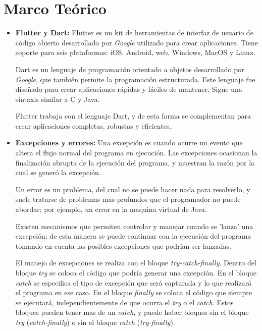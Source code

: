 \documentclass[letterpaper,12pt]{article}
\begin{document}
\section{Marco Teórico}
\begin{itemize}

    \item \textbf{Flutter y Dart:} Flutter es un kit de herramientas de interfaz de usuario de código abierto desarrollado por \textit{Google} utilizado para crear aplicaciones. Tiene soporte para seis plataformas: iOS, Android, web, Windows, MacOS y Linux.

    Dart es un lenguaje de programación orientado a objetos desarrollado por \textit{Google}, que también permite la programación estructurada. Este lenguaje fue diseñado para crear aplicaciones rápidas y fáciles de mantener. Sigue una sintaxis similar a C y Java.

    Flutter trabaja con el lenguaje Dart, y de esta forma se complementan para crear aplicaciones completas, robustas y eficientes. ~\cite{FlutterDart1} ~\cite{FlutterDart2}
    
    \item \textbf{Excepciones y errores:} Una excepción es cuando ocurre un evento que altera el flujo normal del programa en ejecución. Las excepciones ocasionan la finalización abrupta de la ejecución del programa, y muestran la razón por la cual se generó la excepción.

    Un error es un problema, del cual no se puede hacer nada para resolverlo, y suele tratarse de problemas mas profundos que el programador no puede abordar; por ejemplo, un error en la maquina virtual de Java.
    
    Existen mecanismos que permiten controlar y manejar cuando se 'lanza' una excepción; de esta manera se puede continuar con la ejecución del programa tomando en cuenta las posibles excepciones que podrían ser lanzadas.

    El manejo de excepciones se realiza con el bloque \textit{try-catch-finally}. Dentro del bloque \textit{try} se coloca el código que podría generar una excepción. En el bloque \textit{catch} se especifica el tipo de excepción que será capturada y lo que realizará el programa en ese caso. En el bloque \textit{finally} se coloca el código que siempre se ejecutará, independientemente de que ocurra el \textit{try} o el \textit{catch}. Estos bloques pueden tener mas de un \textit{catch}, y puede haber bloques sin el bloque \textit{try} (\textit{catch-finally}) o sin el bloque \textit{catch} (\textit{try-finally}). 


\end{itemize}
\end{document}
